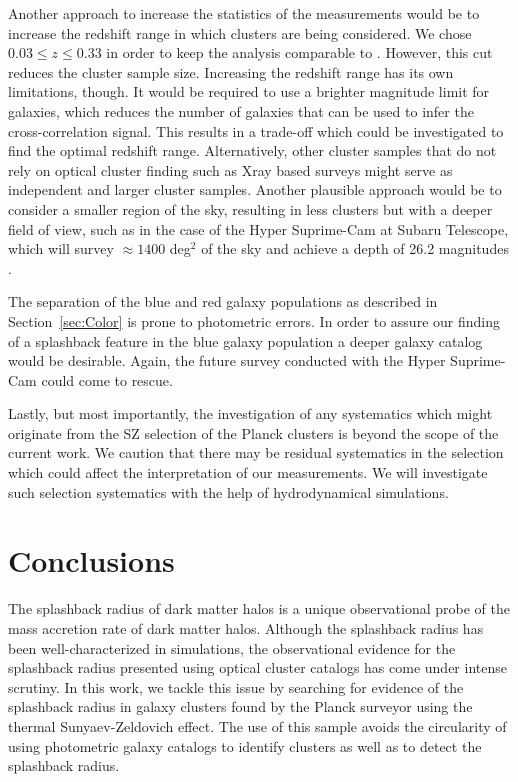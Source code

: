 \documentclass[iop, apjl, twocolappendix, numberedappendix]{emulateapj}
\begin{document}
Another approach to increase the statistics of the measurements would 
be to increase the redshift range in which clusters are being considered. 
We chose $0.03 \leq z \leq 0.33$ in order to keep the analysis comparable 
to \citet{more2016detection}. However, this cut reduces the cluster sample 
size. Increasing the redshift range has its own limitations, though. 
It would be required to use a brighter magnitude limit for galaxies, 
which reduces the number of galaxies that can be used to infer the 
cross-correlation signal. This results in a trade-off which could be investigated
to find the optimal redshift range. Alternatively, other cluster samples that do 
not rely on optical cluster finding such as Xray based surveys might 
serve as independent and larger cluster samples. 
Another plausible approach would be to consider a smaller region of
the sky, resulting in less clusters but with a deeper field of view,
such as in the case of the Hyper Suprime-Cam at Subaru Telescope,
which will survey $\approx 1400$ deg$^2$ of the sky and achieve a
depth of 26.2 magnitudes \citep{takada2010subaru}.

The separation of the blue and red galaxy populations as described in 
Section~\ref{sec:Color} is prone to photometric errors. In order to 
assure our finding of a splashback feature in the blue galaxy population
a deeper galaxy catalog would be desirable. Again, the future survey
conducted with the Hyper Suprime-Cam could come to rescue.

Lastly, but most importantly, the investigation of any systematics
which might originate from the SZ selection of the Planck clusters
is beyond the scope of the current work. We caution that there may
be residual systematics in the selection which could affect the
interpretation of our measurements. We will investigate such
selection systematics with the help of hydrodynamical simulations.

\section{Conclusions}
\label{sec:Conclusions}
The splashback radius of dark matter halos is a unique observational
probe of the mass accretion rate of dark matter halos. Although the
splashback radius has been well-characterized in simulations, the
observational evidence for the splashback radius presented using
optical cluster catalogs has come under intense scrutiny. In this
work, we tackle this issue by searching for evidence of the
splashback radius in galaxy clusters found by the Planck surveyor using
the thermal Sunyaev-Zeldovich effect. The use of this sample avoids
the circularity of using photometric galaxy catalogs to identify
clusters as well as to detect the splashback radius. 
\end{document}
